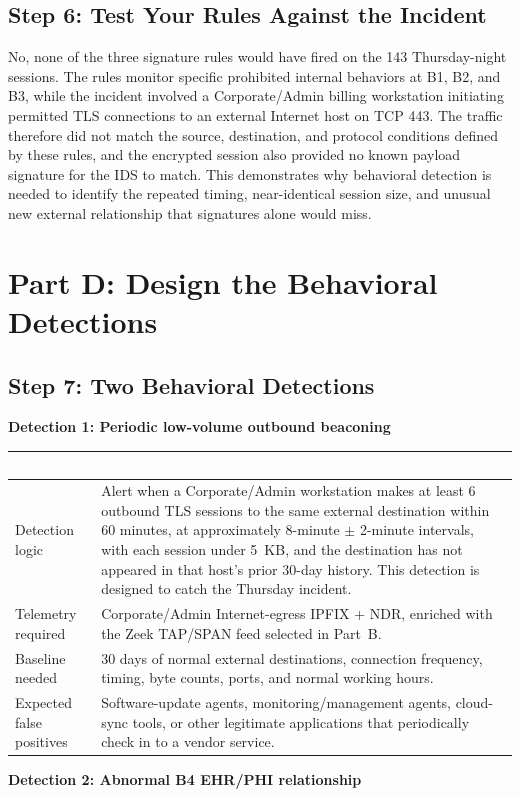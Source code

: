 \documentclass[11pt,letterpaper]{article}
\renewcommand{\arraystretch}{1.22}
\newcommand{\labtablesetup}{%
  \footnotesize
  \setlength{\tabcolsep}{4pt}%
  \renewcommand{\arraystretch}{1.28}%
}
\newcommand{\labpart}[1]{%
  \par\vspace{0.15em}%
  \Needspace{10\baselineskip}%
  \section*{#1}%
  \nopagebreak
}
\newcommand{\labstep}[1]{%
  \Needspace{8\baselineskip}%
  \subsection*{#1}%
  \nopagebreak
}
\begin{document}
\labstep{Step 6: Test Your Rules Against the Incident}

No, none of the three signature rules would have fired on the 143 Thursday-night sessions. The rules monitor specific prohibited internal behaviors at B1, B2, and B3, while the incident involved a Corporate/Admin billing workstation initiating permitted TLS connections to an external Internet host on TCP 443. The traffic therefore did not match the source, destination, and protocol conditions defined by these rules, and the encrypted session also provided no known payload signature for the IDS to match. This demonstrates why behavioral detection is needed to identify the repeated timing, near-identical session size, and unusual new external relationship that signatures alone would miss.

\labpart{Part D: Design the Behavioral Detections}

\labstep{Step 7: Two Behavioral Detections}

\noindent\textbf{Detection 1: Periodic low-volume outbound beaconing}

\begingroup\labtablesetup
\begin{tabularx}{\textwidth}{@{}L{3.6cm}Y@{}}
\toprule
{}
\textcolor{white}{\textbf{Field}} &
\textcolor{white}{\textbf{Detail}} \\
\midrule
Detection logic &
Alert when a Corporate/Admin workstation makes at least 6 outbound TLS sessions to the same external destination within 60 minutes, at approximately 8-minute $\pm$ 2-minute intervals, with each session under 5~KB, and the destination has not appeared in that host's prior 30-day history. This detection is designed to catch the Thursday incident. \\
Telemetry required &
Corporate/Admin Internet-egress IPFIX + NDR, enriched with the Zeek TAP/SPAN feed selected in Part~B. \\
Baseline needed &
30 days of normal external destinations, connection frequency, timing, byte counts, ports, and normal working hours. \\
Expected false positives &
Software-update agents, monitoring/management agents, cloud-sync tools, or other legitimate applications that periodically check in to a vendor service. \\
\bottomrule
\end{tabularx}
\endgroup

\vspace{0.6em}
\noindent\textbf{Detection 2: Abnormal B4 EHR/PHI relationship}
\end{document}
